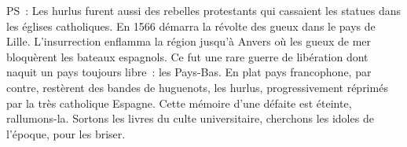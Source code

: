 \documentclass[french,twoside]{book} %
\newif\ifdev
\renewcommand{\LettrineFontHook}{\color{rubric}}
\newcommand{\initialiv}[2]{%
  \let\oldLFH\LettrineFontHook
  \IfSubStr{QJ’}{#1}{
    \lettrine[lines=4, lhang=0.2, loversize=-0.1, lraise=0.2]{\smash{#1}}{#2}
  }{\IfSubStr{É}{#1}{
    \lettrine[lines=4, lhang=0.2, loversize=-0, lraise=0]{\smash{#1}}{#2}
  }{\IfSubStr{ÀÂ}{#1}{
    \lettrine[lines=4, lhang=0.2, loversize=-0, lraise=0, slope=0.6em]{\smash{#1}}{#2}
  }{\IfSubStr{A}{#1}{
    \lettrine[lines=4, lhang=0.2, loversize=0.2, slope=0.6em]{\smash{#1}}{#2}
  }{\IfSubStr{V}{#1}{
    \lettrine[lines=4, lhang=0.2, loversize=0.2, slope=-0.5em]{\smash{#1}}{#2}
  }{
    \lettrine[lines=4, lhang=0.2, loversize=0.2]{\smash{#1}}{#2}
  }}}}}
  \let\LettrineFontHook\oldLFH
}
\renewcommand{\LettrineFontHook}{\bfseries\color{rubric}}
\begin{document}
  \bigskip

  \noindent PS : Les hurlus furent aussi des rebelles protestants qui cassaient les statues dans les églises catholiques. En 1566 démarra la révolte des gueux dans le pays de Lille. L’insurrection enflamma la région jusqu’à Anvers où les gueux de mer bloquèrent les bateaux espagnols.
  Ce fut une rare guerre de libération dont naquit un pays toujours libre : les Pays-Bas.
  En plat pays francophone, par contre, restèrent des bandes de huguenots, les hurlus, progressivement réprimés par la très catholique Espagne.
  Cette mémoire d’une défaite est éteinte, rallumons-la. Sortons les livres du culte universitaire, cherchons les idoles de l’époque, pour les briser.
\fi

\ifdev %
\fontname\font — \textsc{Les règles du jeu}\par
(\hyperref[utopie]{\underline{Lien}})\par
\noindent \initialiv{A}{lors là}\blindtext\par
\noindent \initialiv{À}{ la bonheur des dames}\blindtext\par
\noindent \initialiv{É}{tonnez-le}\blindtext\par
\noindent \initialiv{Q}{ualitativement}\blindtext\par
\noindent \initialiv{V}{aloriser}\blindtext\par
\Blindtext
\phantomsection
\label{utopie}
\Blinddocument
\fi
\end{document}

